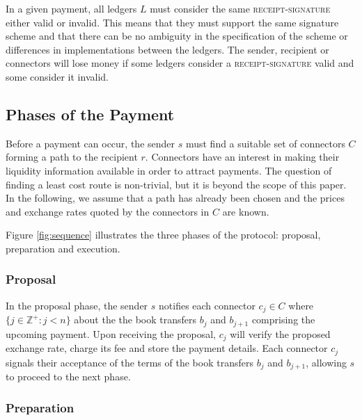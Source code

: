 \documentclass[letterpaper,twocolumn,10pt]{article}
\begin{document}
In a given payment, all ledgers $L$ must consider the same \textsc{receipt-signature} either valid or invalid. This means that they must support the same signature scheme and that there can be no ambiguity in the specification of the scheme or differences in implementations between the ledgers. The sender, recipient or connectors will lose money if some ledgers consider a \textsc{receipt-signature} valid and some consider it invalid.




\subsection{Phases of the Payment}

Before a payment can occur, the sender $s$ must find a suitable set of connectors $C$ forming a path to the recipient $r$. Connectors have an interest in making their liquidity information available in order to attract payments. The question of finding a least cost route is non-trivial, but it is beyond the scope of this paper.
In the following, we assume that a path has already been chosen and the prices and exchange rates quoted by the connectors in $C$ are known.

Figure \ref{fig:sequence} illustrates the three phases of the protocol: proposal, preparation and execution.



\subsubsection{Proposal}

In the proposal phase, the sender $s$ notifies each connector $c_j \in C$ where $ \{ j \in \mathbb{Z}^+ : j < n \} $ about the the book transfers $b_j$ and $b_{j+1}$ comprising the upcoming payment. Upon receiving the proposal, $c_j$ will verify the proposed exchange rate, charge its fee and store the payment details. Each connector $c_j$ signals their acceptance of the terms of the book transfers $b_j$ and $b_{j+1}$, allowing $s$ to proceed to the next phase.

\subsubsection{Preparation}
\end{document}
